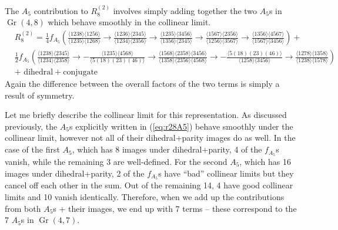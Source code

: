 \documentclass[11pt]{article}
\DeclareMathOperator{\Gr}{Gr}
\begin{document}
The $A_5$ contribution to $R^{(2)}_8$ involves simply adding together the two $A_5$s in $\Gr(4,8)$ which behave smoothly in the collinear limit. 
\begin{equation}
\begin{split}
	&R^{(2)}_8 = \frac14 f_{A_5}\left(\frac{\langle 1238\rangle  \langle 1256\rangle }{\langle
   1235\rangle  \langle 1268\rangle }\to \frac{\langle
   1236\rangle  \langle 2345\rangle }{\langle 1234\rangle
    \langle 2356\rangle }\to \frac{\langle 1235\rangle 
   \langle 3456\rangle }{\langle 1356\rangle  \langle
   2345\rangle }\to \frac{\langle 1567\rangle  \langle
   2356\rangle }{\langle 1256\rangle  \langle 3567\rangle
   }\to \frac{\langle 1356\rangle  \langle 4567\rangle
   }{\langle 1567\rangle  \langle 3456\rangle }\right)+\\
   &\frac12 f_{A_5}\left(\frac{\langle 1238\rangle  \langle 2345\rangle
   }{\langle 1234\rangle  \langle 2358\rangle
   }\to-\frac{\langle 1235\rangle  \langle 4568\rangle
   }{\langle 5(18)(23)(46)\rangle }\to\frac{\langle
   1568\rangle  \langle 2358\rangle  \langle 3456\rangle
   }{\langle 1358\rangle  \langle 2356\rangle  \langle
   4568\rangle }\to-\frac{\langle 5(18)(23)(46)\rangle
   }{\langle 1258\rangle  \langle 3456\rangle
   }\to\frac{\langle 1278\rangle  \langle 1358\rangle
   }{\langle 1238\rangle  \langle 1578\rangle }\right)\\
   &+\text{ dihedral} + \text{conjugate}
\end{split}
\end{equation}
Again the difference between the overall factors of the two terms is simply a result of symmetry. 

Let me briefly describe the collinear limit for this representation. As discussed previously, the $A_5$s explicitly written in (\ref{eq:r28A5}) behave smoothly under the collinear limit, however not all of their dihedral+parity images do as well. In the case of the first $A_5$, which has 8 images under dihedral+parity, 4 of the $f_{A_5}$s vanish, while the remaining 3 are well-defined. For the second $A_5$, which has 16 images under dihedral+parity, 2 of the $f_{A_5}$s have ``bad'' collinear limits but they cancel off each other in the sum. Out of the remaining 14, 4 have good collinear limits and 10 vanish identically. Therefore, when we add up the contributions from both $A_5$s + their images, we end up with 7 terms -- these correspond to the 7 $A_5$s in $\Gr(4,7)$. 
\end{document}
